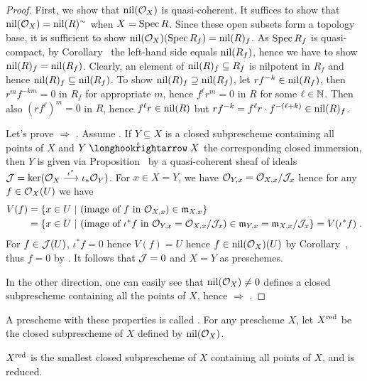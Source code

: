 \documentclass[a4paper,parskip=half,numbers=enddot, DIV=12]{scrreprt}
\begin{document}
\begin{proof}
    First, we show that $\operatorname{nil}(\mathcal{O}_X)$ is quasi-coherent. It suffices to show that $\operatorname{nil}(\mathcal{O}_X) = \operatorname{nil}(R)^\sim$ when $X=\operatorname{Spec} R$. Since these open subsets form a topology base, it is sufficient to show $\operatorname{nil}(\mathcal{O}_X)(\operatorname{Spec} R_f) = \operatorname{nil}(R)_f$. As $\operatorname{Spec} R_f$ is quasi-compact, by Corollary~ the left-hand side equals $\operatorname{nil}(R_f)$, hence we have to show $\operatorname{nil}(R)_f = \operatorname{nil}(R_f)$. Clearly, an element of $\operatorname{nil}(R)_f\subseteq R_f$ is nilpotent in $R_f$ and hence $\operatorname{nil}(R)_f\subseteq\operatorname{nil}(R_f)$. To show $\operatorname{nil}(R)_f\supseteq\operatorname{nil}(R_f)$, let $rf^{-k}\in \operatorname{nil}(R_f)$, then $r^mf^{-km} = 0$ in $R_f$ for appropriate $m$, hence $f^\ell r^m = 0$ in $R$ for some $\ell\in\mathbb{N}$. Then also $(rf^\ell)^m = 0$ in $R$, hence $f^\ell r\in \operatorname{nil}(R)$ but $rf^{-k}=f^\ell r\cdot f^{-(\ell+k)}\in \operatorname{nil}(R)_f$.
    
    Let's prove  $\Rightarrow$ . Assume . If $Y\subseteq X$ is a closed subprescheme containing all points of $X$ and $Y\monomorphism[\iota]X$ the corresponding closed immersion, then $Y$ is given via Proposition~ by a quasi-coherent sheaf of ideals $\Jj=\ker(\Oo_X\morphism[\iota^*]\iota_*\Oo_Y)$. For $x\in X=Y$, we have $\mathcal{O}_{Y,x}= \mathcal{O}_{X,x}/\mathcal{J}_x$ hence for any $f\in \mathcal{O}_X(U)$ we have
    \begin{align*}
    	V(f) &= \left\{x\in U\ \middle|\  (\text{image of }f\text{ in }\mathcal{O}_{X,x})\in\mathfrak{m}_{X,x}\right\}\\
    	&= \left\{x\in U\ \middle|\  (\text{image of }\iota^*f\text{ in }\mathcal{O}_{Y,x}=\mathcal{O}_{X,x}/\mathcal{J}_x)\in\mathfrak{m}_{Y,x}=\mathfrak{m}_{X,x}/\mathcal{J}_x\right\}=V(\iota^*f)\;.
    \end{align*}
     For $f\in \mathcal{J}(U)$, $\iota^*f = 0$ hence $V(f) = U$ hence $f\in \operatorname{nil}(\mathcal{O}_X)(U)$ by Corollary~, thus $f=0$ by . It follows that $\mathcal{J}=0$ and $X=Y$ as preschemes.
    
    In the other direction, one can easily see that $\operatorname{nil}(\mathcal{O}_X) \neq 0$ defines a closed subprescheme containing all the points of $X$, hence  $\Rightarrow$ .
\end{proof}
\begin{defi} 
    A prescheme with these properties is called . For any prescheme $X$, let $X^{\mathrm{red}}$ be the closed subprescheme of $X$ defined by $\operatorname{nil}(\mathcal{O}_X)$.
\end{defi}
\begin{rem}
    $X^{\mathrm{red}}$ is the smallest closed subprescheme of $X$ containing all points of $X$, and is reduced.
\end{rem}
\end{document}
